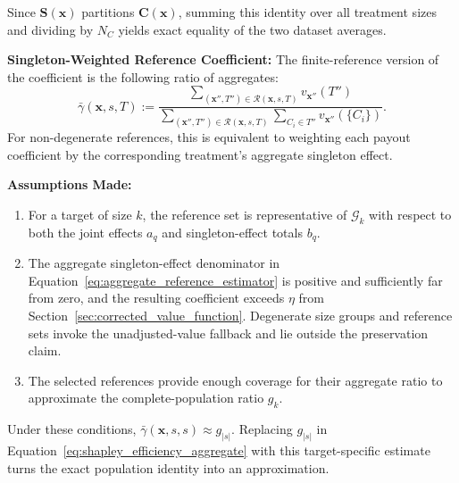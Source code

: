 \begin{math_box}[label=ma:dataset_average_preservation]
    Since $\mathbf{S}(\mathbf{x})$ partitions $\mathbf{C}(\mathbf{x})$,
    summing this identity over all treatment sizes and dividing by $N_C$ yields
    exact equality of the two dataset averages.

    \smallskip
    \textbf{Singleton-Weighted Reference Coefficient:} The finite-reference
    version of the coefficient is the following ratio of aggregates:
    \begin{equation}
        \label{eq:aggregate_reference_estimator}
        \bar\gamma(\mathbf{x},s,T)
        :=
        \frac{
            \displaystyle
            \sum_{(\mathbf{x}'',T'')\in\mathcal{R}(\mathbf{x},s,T)}
            v_{\mathbf{x}''}(T'')
        }{
            \displaystyle
            \sum_{(\mathbf{x}'',T'')\in\mathcal{R}(\mathbf{x},s,T)}
            \sum_{C_i\in T''}v_{\mathbf{x}''}(\{C_i\})
        }.
    \end{equation}
    For non-degenerate references, this is equivalent to weighting each payout
    coefficient by the corresponding treatment's aggregate singleton effect.

    \smallskip
    \textbf{Assumptions Made:}
    \begin{enumerate}
        \item For a target of size
        $k$, the reference set is representative of $\mathcal{G}_k$ with respect
        to both the joint effects $a_q$ and singleton-effect totals $b_q$.

        \item The aggregate singleton-effect
        denominator in Equation~\ref{eq:aggregate_reference_estimator} is positive
        and sufficiently far from zero, and the resulting coefficient exceeds
        $\eta$ from Section~\ref{sec:corrected_value_function}. Degenerate size groups and reference sets invoke the
        unadjusted-value fallback and lie outside the preservation claim.

        \item The selected references provide enough
        coverage for their aggregate ratio to approximate the complete-population
        ratio $g_k$.
    \end{enumerate}
    Under these conditions,
    $\bar\gamma(\mathbf{x},s,s)\approx g_{|s|}$. Replacing $g_{|s|}$ in
    Equation~\ref{eq:shapley_efficiency_aggregate} with this target-specific
    estimate turns the exact population identity into an approximation.
\end{math_box}
